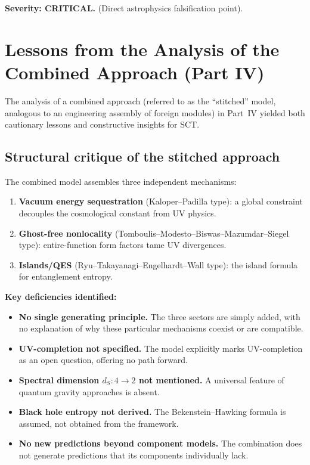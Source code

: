 \documentclass[12pt,a4paper]{article}
\begin{document}
\textbf{Severity: CRITICAL.} (Direct astrophysics falsification point).

\section{Lessons from the Analysis of the Combined Approach (Part IV)}
\label{sec:lessons}

The analysis of a combined approach (referred to as the ``stitched'' model,
analogous to an engineering assembly of foreign modules) in Part~IV yielded
both cautionary lessons and constructive insights for SCT.

\subsection{Structural critique of the stitched approach}

The combined model assembles three independent mechanisms:
\begin{enumerate}
  \item \textbf{Vacuum energy sequestration} (Kaloper--Padilla type):
    a global constraint decouples the cosmological constant from UV physics.
  \item \textbf{Ghost-free nonlocality} (Tomboulis--Modesto--Biswas--Mazumdar--Siegel type):
    entire-function form factors tame UV divergences.
  \item \textbf{Islands/QES} (Ryu--Takayanagi--Engelhardt--Wall type):
    the island formula for entanglement entropy.
\end{enumerate}

\textbf{Key deficiencies identified:}
\begin{itemize}
  \item \textbf{No single generating principle.} The three sectors are simply added,
    with no explanation of why these particular mechanisms coexist or are compatible.
  \item \textbf{UV-completion not specified.} The model explicitly marks
    UV-completion as an open question, offering no path forward.
  \item \textbf{Spectral dimension $d_S: 4 \to 2$ not mentioned.}
    A universal feature of quantum gravity approaches is absent.
  \item \textbf{Black hole entropy not derived.} The Bekenstein--Hawking formula
    is assumed, not obtained from the framework.
  \item \textbf{No new predictions beyond component models.} The combination
    does not generate predictions that its components individually lack.
\end{itemize}
\end{document}
